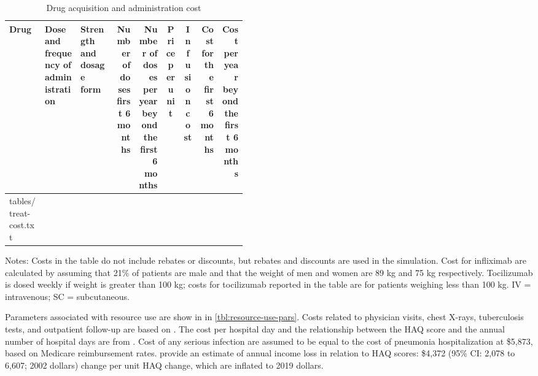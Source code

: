 \documentclass[11pt,final,fleqn]{article}
\makeatletter
\theoremstyle{plain}
\newcommand*\ExpandableInput[1]{\@@input#1 }
\makeatother
\begin{document}
\begin{table}
\begin{center}
\begin{threeparttable}
\caption{Drug acquisition and administration cost} \label{tbl:treat-cost}
\scriptsize
\begin{tabular}{p{0.15\linewidth}p{0.15\linewidth}p{0.15\linewidth}rrrrrr}
\hline
\multicolumn{1}{p{0.15\linewidth}}{Drug} &
\multicolumn{1}{p{0.15\linewidth}}{Dose and frequency of administration} & 
\multicolumn{1}{p{0.15\linewidth}}{Strength and dosage form} & 
\multicolumn{1}{p{0.05\linewidth}}{Number of doses first 6 months}  & 
\multicolumn{1}{p{0.08\linewidth}}{Number of doses per year beyond the first 6 months} & 
\multicolumn{1}{c}{Price per unit} & 
\multicolumn{1}{c}{Infusion cost} & 
\multicolumn{1}{p{0.08\linewidth}}{Cost for the first 6 months} &
\multicolumn{1}{p{0.08\linewidth}}{Cost per year beyond the first 6 months}\\
\hline
\ExpandableInput{tables/treat-cost.txt}
\hline
\end{tabular}
\tiny
Notes: Costs in the table do not include rebates or discounts, but rebates and discounts are used in the simulation. Cost for infliximab are calculated by assuming that 21\% of patients are male and that the weight of men and women are 89 kg and 75 kg respectively. Tocilizumab is dosed weekly if weight is greater than 100 kg; costs for tocilizumab reported in the table are for patients weighing less than 100 kg. IV = intravenous; SC = subcutaneous. 
\end{threeparttable}
\end{center}
\end{table}



Parameters associated with resource use are show in in \autoref{tbl:resource-use-pars}. Costs related to physician visits, chest X-rays, tuberculosis tests, and outpatient follow-up are based on \citet{claxton2016economic}. The cost per hospital day and the relationship between the HAQ score and the annual number of hospital days are from \citet{carlson2015economic}. Cost of any serious infection are assumed to be equal to the cost of pneumonia hospitalization at \$5,873, based on Medicare reimbursement rates. \citet{wolfe2005household} provide an estimate of annual income loss in relation to HAQ scores: \$4,372 (95\% CI: 2,078 to 6,607; 2002 dollars) change per unit HAQ change, which are inflated to 2019 dollars.
\end{document}
